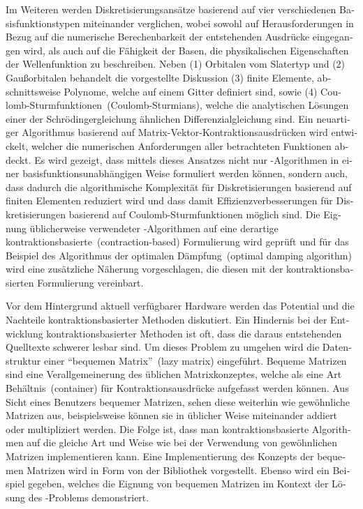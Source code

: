 \begin{otherlanguage}{ngerman}
Im Weiteren werden Diskretisierungsansätze basierend auf vier verschiedenen
Basisfunktionstypen miteinander verglichen,
wobei sowohl auf Herausforderungen in Bezug auf die numerische Berechenbarkeit
der entstehenden Ausdrücke
eingegangen wird,
als auch auf die Fähigkeit der Basen,
die physikalischen Eigenschaften der Wellenfunktion zu beschreiben.
Neben (1) Orbitalen vom Slatertyp und (2) Gaußorbitalen
behandelt die vorgestellte Diskussion
(3) finite Elemente,
abschnittsweise Polynome, welche auf einem Gitter definiert sind,
sowie (4) Coulomb-Sturmfunktionen~(Coulomb-Sturmians),
welche die analytischen Lösungen einer der Schrödingergleichung
ähnlichen Differenzialgleichung sind.
Ein neuartiger Algorithmus basierend auf Matrix-Vektor-Kontraktionsausdrücken
wird entwickelt,
welcher die numerischen Anforderungen aller betrachteten Funktionen abdeckt.
Es wird gezeigt, dass mittels dieses Ansatzes
nicht nur \SCF-Algorithmen in einer basisfunktionsunabhängigen Weise
formuliert werden können, sondern auch,
dass dadurch die algorithmische Komplexität
für Diskretisierungen basierend auf finiten Elementen reduziert wird
und dass damit
Effizienzverbesserungen
für Diskretisierungen basierend auf Coulomb-Sturmfunktionen
möglich sind.
Die Eignung üblicherweise verwendeter \SCF-Algorithmen
auf eine derartige kontraktionsbasierte~(contraction-based)
Formulierung wird geprüft
und für das Beispiel des Algorithmus der optimalen Dämpfung~(optimal damping algorithm)
wird eine zusätzliche Näherung vorgeschlagen,
die diesen mit der kontraktionsbasierten Formulierung vereinbart.

Vor dem Hintergrund aktuell verfügbarer Hardware werden das Potential
und die Nachteile kontraktionsbasierter Methoden diskutiert.
Ein Hindernis bei der Entwicklung kontraktionsbasierter Methoden
ist oft, dass die daraus entstehenden Quelltexte schwerer lesbar sind.
Um dieses Problem zu umgehen wird die Datenstruktur
einer ``bequemen Matrix''~(lazy matrix) eingeführt.
Bequeme Matrizen sind eine Verallgemeinerung des üblichen Matrixkonzeptes,
welche als eine Art Behältnis~(container) für Kontraktionsausdrücke aufgefasst
werden können.
Aus Sicht eines Benutzers bequemer Matrizen,
sehen diese weiterhin wie gewöhnliche Matrizen aus,
beispielsweise können sie in üblicher Weise
miteinander addiert oder multipliziert werden.
Die Folge ist,
dass man kontraktionsbasierte Algorithmen auf die gleiche Art und Weise
wie bei der Verwendung von gewöhnlichen Matrizen implementieren kann.
Eine Implementierung des Konzepts der bequemen Matrizen
wird in Form von der Bibliothek \lazyten vorgestellt.
Ebenso wird ein Beispiel gegeben,
welches die Eignung von bequemen Matrizen im Kontext der
Lösung des \HF-Problems demonstriert.


\end{otherlanguage}
